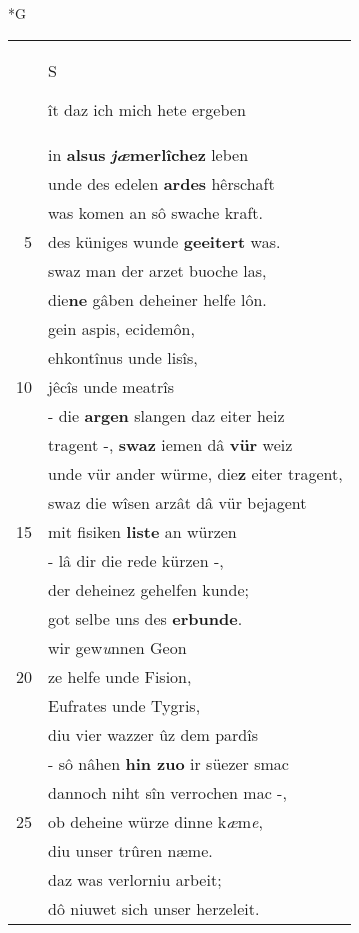 \documentclass[8pt,a4paper,notitlepage]{article}
\begin{document}
\newpage
\begin{table}[ht]
\begin{minipage}[t]{0.5\linewidth}
\small
\begin{center}*G
\end{center}
\begin{tabular}{rl}
 & \begin{large}S\end{large}ît daz ich mich hete ergeben\\ 
 & in \textbf{alsus} \textbf{\textit{jæ}merlîchez} leben\\ 
 & unde des edelen \textbf{ardes} hêrschaft\\ 
 & was komen an sô swache kraft.\\ 
5 & des küniges wunde \textbf{geeitert} was.\\ 
 & swaz man der arzet buoche las,\\ 
 & die\textbf{ne} gâben deheiner helfe lôn.\\ 
 & gein aspis, ecidemôn,\\ 
 & ehkontînus unde lisîs,\\ 
10 & jêcîs unde meatrîs\\ 
 & - die \textbf{argen} slangen daz eiter heiz\\ 
 & tragent -, \textbf{swaz} iemen dâ \textbf{vür} weiz\\ 
 & unde vür ander würme, die\textbf{z} eiter tragent,\\ 
 & swaz die wîsen arzât dâ vür bejagent\\ 
15 & mit fisiken \textbf{liste} an würzen\\ 
 & - lâ dir die rede kürzen -,\\ 
 & der deheinez gehelfen kunde;\\ 
 & got selbe uns des \textbf{erbunde}.\\ 
 & wir gew\textit{u}nnen Geon\\ 
20 & ze helfe unde Fision,\\ 
 & Eufrates unde Tygris,\\ 
 & diu vier wazzer ûz dem pardîs\\ 
 & - sô nâhen \textbf{hin zuo} ir süezer smac\\ 
 & dannoch niht sîn verrochen mac -,\\ 
25 & ob deheine würze dinne k\textit{æ}m\textit{e},\\ 
 & diu unser trûren næme.\\ 
 & daz was verlorniu arbeit;\\ 
 & dô niuwet sich unser herzeleit.\\ 

\end{tabular}
\end{minipage}
\end{table}
\end{document}
